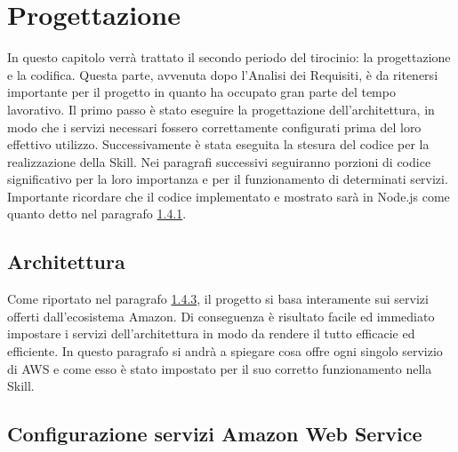 
\chapter{Progettazione}
\label{cap:progettazione}
In questo capitolo verrà trattato il secondo periodo del tirocinio: la progettazione e la codifica. Questa parte, avvenuta dopo l'Analisi dei Requisiti, è da ritenersi importante per il progetto in quanto ha occupato gran parte del tempo lavorativo. Il primo passo è stato eseguire la progettazione dell'architettura, in modo che i servizi necessari fossero correttamente configurati prima del loro effettivo utilizzo. Successivamente è stata eseguita la stesura del codice per la realizzazione della Skill. Nei paragrafi successivi seguiranno porzioni di codice significativo per la loro importanza e per il funzionamento di determinati servizi. Importante ricordare che il codice implementato e mostrato sarà in Node.js come quanto detto nel paragrafo \hyperref[nodejs]{1.4.1}. 
\section{Architettura}
Come riportato nel paragrafo \hyperref[serivizi-aws]{1.4.3}, il progetto si basa interamente sui servizi offerti dall'ecosistema Amazon. Di conseguenza è risultato facile ed immediato impostare i servizi dell'architettura in modo da rendere il tutto efficacie ed efficiente. In questo paragrafo si andrà a spiegare cosa offre ogni singolo servizio di AWS e come esso è stato impostato per il suo corretto funzionamento nella Skill.

\section{Configurazione servizi Amazon Web Service}
